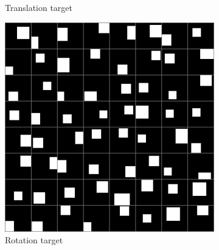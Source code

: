 \documentclass[10pt,a4paper]{article}
\begin{document}
\begin{figure}[!ht]
\begin{subfigure}{0.49\textwidth}
	\caption{Translation target}
	\label{sq_tt}
\end{subfigure}
\begin{subfigure}{0.49\textwidth}
	\centering	
	\includegraphics[width=\textwidth]{square_target1.png}
	\caption{Rotation target}
	\label{sq_rt}
\end{subfigure}
\caption{} \label{square_images}
\end{figure}
\end{document}
